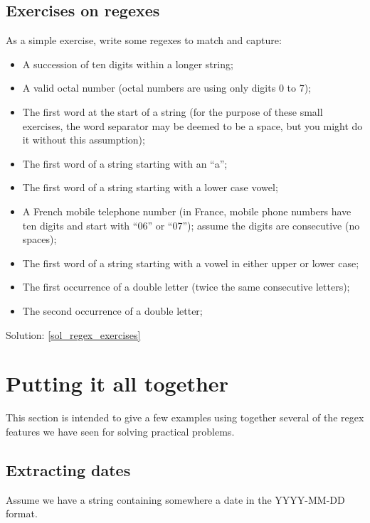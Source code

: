 \subsection{Exercises on regexes}
\label{regex_exercises}

As a simple exercise, write some regexes to match and capture:

\begin{itemize}
\item A succession of ten digits within a longer string;
\item A valid octal number (octal numbers are using only 
digits 0 to 7);
\item The first word at the start of a string (for the 
purpose of these small exercises, the word 
separator may be deemed to be a space, but you might do 
it without this assumption);
\item The first word of a string starting with an ``a'';
\item The first word of a string starting with a lower case vowel;
\item A French mobile telephone number (in France, mobile 
phone numbers have ten digits and start with ``06'' or ``07''); 
assume the digits are consecutive (no spaces);
\item The first word of a string starting with a vowel in 
either upper or lower case;
\item The first occurrence of a double letter (twice the
same consecutive letters);
\item The second occurrence of a double letter;
 
\end{itemize}

Solution: \ref{sol_regex_exercises}
 

\section{Putting it all together}

This section is intended to give a few examples using together 
several of the regex features we have seen for solving practical 
problems.

\subsection{Extracting dates}
\label{extracting_dates}

Assume we have a string containing somewhere a 
date in the YYYY-MM-DD format.

